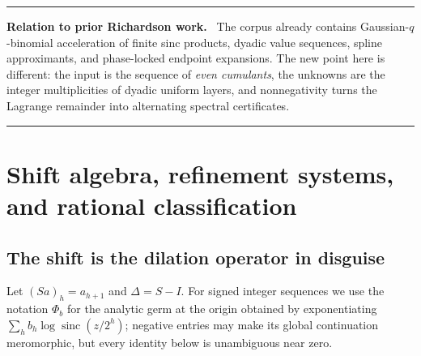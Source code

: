 \documentclass[11pt,oneside]{article}
\numberwithin{equation}{section}
\theoremstyle{definition}
\theoremstyle{remark}
\newcommand{\sinc}{\operatorname{sinc}}
\newenvironment{statusbox}[1]{%
  \par\medskip\noindent\begin{center}\begin{minipage}{0.94\textwidth}%
  \color{linkblue}\hrule\vspace{0.65em}%
  \color{black}\textbf{\color{linkblue}#1.}\ }{%
  \par\vspace{0.65em}\color{linkblue}\hrule
  \end{minipage}\end{center}\medskip}
\begin{document}
\begin{statusbox}{Relation to prior Richardson work}
The corpus already contains Gaussian-$q$-binomial acceleration of finite sinc products,
dyadic value sequences, spline approximants, and phase-locked endpoint expansions.  The new
point here is different: the input is the sequence of \emph{even cumulants}, the unknowns are
the integer multiplicities of dyadic uniform layers, and nonnegativity turns the Lagrange
remainder into alternating spectral certificates.
\end{statusbox}


\section{Shift algebra, refinement systems, and rational classification}
\label{sec:shift}

\subsection{The shift is the dilation operator in disguise}

Let $(Sa)_h=a_{h+1}$ and $\Delta=S-I$.  For signed integer sequences we use the notation
$\Phi_b$ for the analytic germ at the origin obtained by exponentiating
$\sum_hb_h\log\sinc(z/2^h)$; negative entries may make its global continuation
meromorphic, but every identity below is unambiguous near zero.
\end{document}
